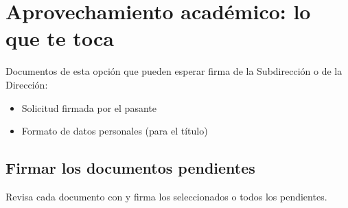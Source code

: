 \section{Aprovechamiento académico: lo que te toca}
Documentos de esta opción que pueden esperar firma de la Subdirección o de la Dirección:
\begin{itemize}
  \item Solicitud firmada por el pasante
  \item Formato de datos personales (para el título)
\end{itemize}
\subsection{Firmar los documentos pendientes}
Revisa cada documento con  y firma los seleccionados o todos los pendientes.
